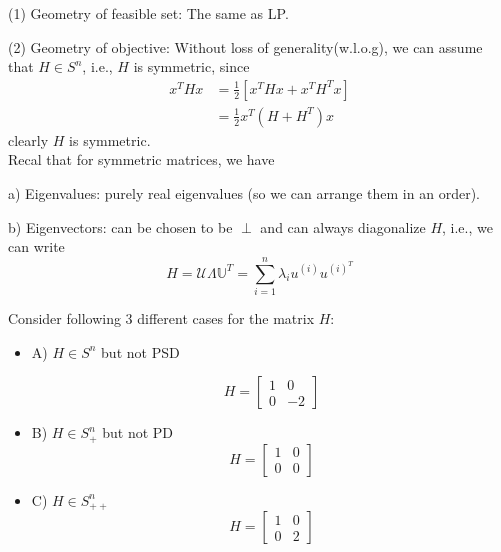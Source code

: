 (1) Geometry of feasible set: The same as LP.

(2) Geometry of objective: Without loss of generality(w.l.o.g), we can assume that $H\in S^n$, i.e., $H$ is symmetric, since
\begin{align*}
x^THx 
&=\frac{1}{2}[x^THx + x^TH^Tx]\\
&= \frac{1}{2}x^T(H+H^T)x
\end{align*}
clearly $H$ is symmetric.\\

Recal that for symmetric matrices, we have

a) Eigenvalues: purely real eigenvalues (so we can arrange them in an order).

b) Eigenvectors: can be chosen to be $\perp$ and can always diagonalize $H$, i.e., we can write
$$H = \mathcal{U}\Lambda \mathbb{U}^T  = \sum^n_{i=1}\lambda_iu^{(i)}u^{(i)^T}$$

Consider following 3 different cases for the matrix $H$:
\begin{itemize}
	\item A) $H\in S^n$ but not PSD
	
	\begin{equation*}
	H = 
	\begin{bmatrix}
	1&0\\
	0&-2
	\end{bmatrix}
	\end{equation*}
	
	\item B) $H\in S^n_+$ but not PD
	\begin{equation*}
	H = 
	\begin{bmatrix}
	1&0\\
	0&0
	\end{bmatrix}
	\end{equation*}
	
	\item C) $H\in S^n_{++}$
	\begin{equation*}
	H = \begin{bmatrix}
	1&0\\
	0&2
	\end{bmatrix}
	\end{equation*}
\end{itemize}



